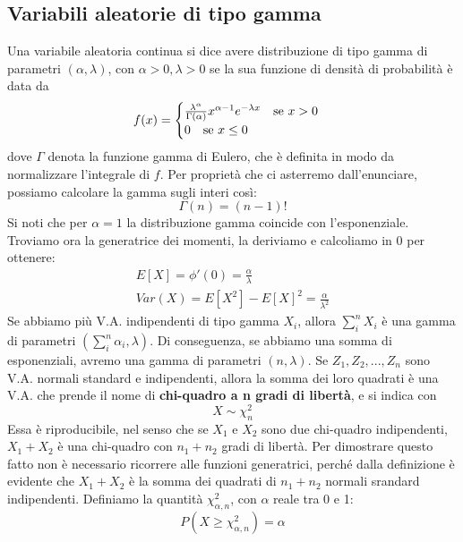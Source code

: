 \documentclass[11pt]{article}
\begin{document}
\subsection{Variabili aleatorie di tipo gamma}
Una variabile aleatoria continua si dice avere distribuzione di tipo gamma di parametri $(\alpha,\lambda)$, con $\alpha>0, \lambda>0$ se la sua funzione di densità di probabilità è data da 
\begin{displaymath}
    f(x) =
    \begin{cases}
        \frac{\lambda^\alpha}{\Gamma(\alpha)}x^{\alpha-1}e^{-\lambda x} \hspace{10px}\mbox{se } x>0\\ 
        0  \hspace{10px}\mbox{se } x\le0
    \end{cases}
\end{displaymath}
dove $\Gamma$ denota la funzione gamma di Eulero, che è definita in modo da normalizzare l'integrale di $f$.
Per proprietà che ci asterremo dall'enunciare, possiamo calcolare la gamma sugli interi così:
\begin{displaymath}
    \Gamma(n) = (n-1)!
\end{displaymath}
Si noti che per $\alpha=1$ la distribuzione gamma coincide con l'esponenziale. Troviamo ora la generatrice dei momenti, la deriviamo e calcoliamo in 0 per ottenere:
\begin{gather*}
    E[X] = \phi'(0) = \frac{\alpha}{\lambda}\\
    Var(X) = E[X^2]-E[X]^2 = \frac{\alpha}{\lambda^2}
\end{gather*}
Se abbiamo più V.A. indipendenti di tipo gamma $X_i$, allora $\sum_i^n X_i$ è una gamma di parametri $(\sum_i^n \alpha_i,\lambda)$. Di conseguenza, se abbiamo una somma di esponenziali, avremo una gamma di parametri $(n, \lambda)$.
Se $Z_1, Z_2, ..., Z_n$ sono V.A. normali standard e indipendenti, allora la somma dei loro quadrati è una V.A. che prende il nome di \textbf{chi-quadro a n gradi di libertà}, e si indica con
\begin{displaymath}
    X \sim \chi_n^2
\end{displaymath}  
Essa è riproducibile, nel senso che se $X_1$ e $X_2$ sono due chi-quadro indipendenti, $X_1+X_2$ è una chi-quadro con $n_1+n_2$ gradi di libertà. Per dimostrare questo fatto non è necessario ricorrere alle funzioni generatrici, perché dalla definizione è evidente che $X_1+X_2$ è la somma dei quadrati di $n_1+n_2$ normali srandard indipendenti. 
Definiamo la quantità $\chi_{\alpha,n}^2$, con $\alpha$ reale tra 0 e 1:
\begin{displaymath}
    P(X\ge \chi_{\alpha,n}^2) = \alpha
\end{displaymath}
\end{document}
